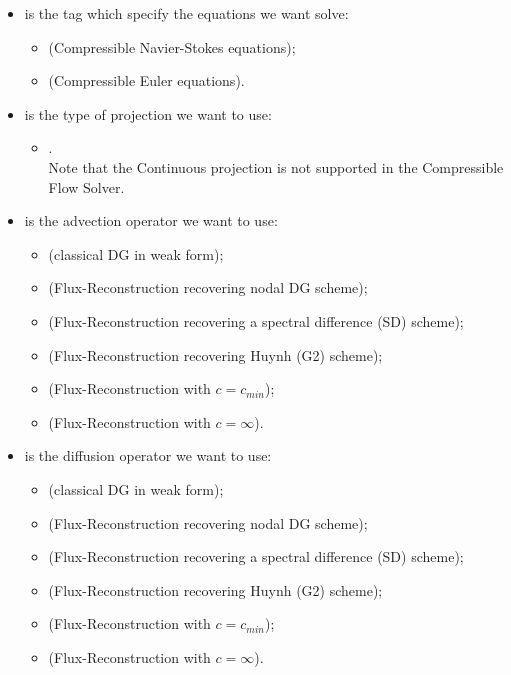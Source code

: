 \begin{itemize}
\item {} is the tag which specify the equations we want solve:
\begin{itemize}
\item {} (Compressible Navier-Stokes equations);
\item {} (Compressible Euler equations).
\end{itemize}
\item {} is the type of projection we want to use:
\begin{itemize}
\item {}.\\
Note that the Continuous projection is not supported in the Compressible Flow Solver. 
\end{itemize}
\item {} is the advection operator we want to use:
\begin{itemize}
\item {} (classical DG in weak form);
\item {} (Flux-Reconstruction recovering nodal DG scheme);
\item {} (Flux-Reconstruction recovering a spectral difference (SD) scheme);
\item {} (Flux-Reconstruction recovering Huynh (G2) scheme);
\item {} (Flux-Reconstruction with $c = c_{min}$);
\item {} (Flux-Reconstruction with $c = \infty$).
\end{itemize}
\item {} is the diffusion operator we want to use:
\begin{itemize}
\item {} (classical DG in weak form);
\item {} (Flux-Reconstruction recovering nodal DG scheme);
\item {} (Flux-Reconstruction recovering a spectral difference (SD) scheme);
\item {} (Flux-Reconstruction recovering Huynh (G2) scheme);
\item {} (Flux-Reconstruction with $c = c_{min}$);
\item {} (Flux-Reconstruction with $c = \infty$).
\end{itemize}

\end{itemize}
